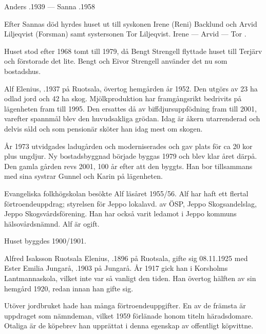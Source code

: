 Anders .1939  ---  Sanna .1958

Efter Sannas död hyrdes huset ut till syskonen Irene (Reni) Backlund och Arvid Liljeqvist (Forsman) samt systersonen Tor Liljeqvist. Irene	  ---  Arvid   ---  Tor	.

Huset stod efter 1968 tomt till 1979, då Bengt Strengell flyttade huset till Terjärv och förstorade det lite. Bengt och Eivor Strengell använder det nu som bostadshus.






Alf Elenius, .1937 på Ruotsala, övertog hemgården år 1952. Den utgörs av 23 ha odlad jord och 42 ha skog. Mjölkproduktion har framgångsrikt bedrivits på lägenheten fram till 1995. Den ersattes då av biffdjursuppfödning fram till 2001, varefter spannmål blev den huvudsakliga grödan. Idag är åkern utarrenderad och delvis såld och som pensionär  sköter han idag mest om skogen.

År 1973 utvidgades ladugården och moderniserades och gav plats för ca 20 kor plus ungdjur. Ny bostadsbyggnad började byggas 1979 och blev klar året därpå. Den gamla gården revs 2001, 100 år efter att den byggts. Han bor tillsammans med sina systrar Gunnel och Karin på lägenheten.

Evangeliska folkhögskolan besökte Alf läsåret 1955/56. Alf har haft ett flertal förtroendeuppdrag; styrelsen för Jeppo lokalavd. av ÖSP, Jeppo Skogsandelslag, Jeppo Skogsvårdsförening. Han har också varit ledamot i Jeppo kommuns hälsovårdsnämnd. Alf är ogift.



Huset byggdes 1900/1901.



Alfred Isaksson Ruotsala Elenius, .1896 på Ruotsala, gifte sig 08.11.1925 med Ester Emilia Jungarå, .1903 på Jungarå. År 1917 gick han i Korsholms Lantmannaskola, vilket inte var så vanligt den tiden. Han övertog hälften av sin hemgård 1920, redan innan han gifte sig.

Utöver jordbruket hade han många förtroendeuppgifter. En av de främsta är uppdraget som nämndeman, vilket 1959 förlänade honom titeln häradsdomare. Otaliga är de köpebrev han upprättat i denna egenskap av offentligt köpvittne.

